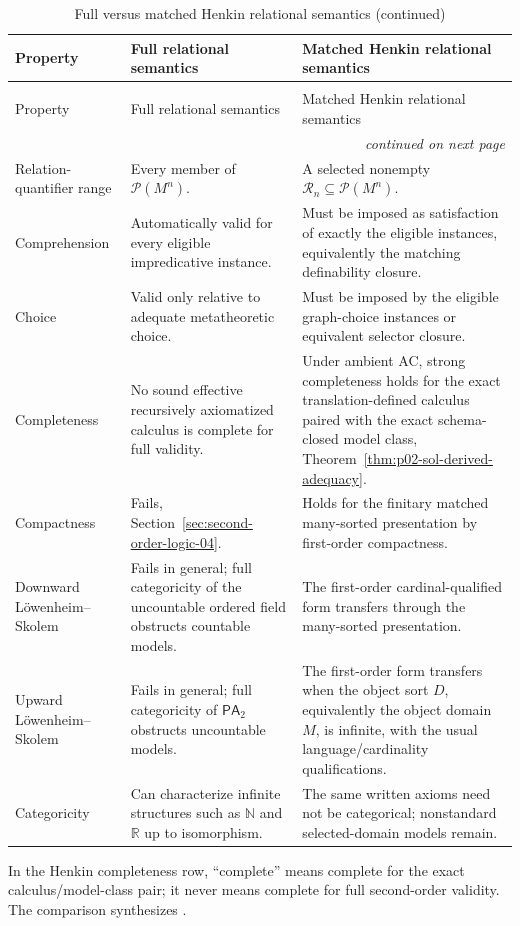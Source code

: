 \begin{landscape}
\begingroup\scriptsize\setlength{\tabcolsep}{4pt}
\begin{longtable}{@{}p{1.35in}p{2.95in}p{2.95in}@{}}
\caption{Full versus matched Henkin relational semantics.}
\label{tab:p02-full-vs-henkin-sol}\\
\toprule
Property & Full relational semantics & Matched Henkin relational semantics \\ \midrule
\endfirsthead
\caption[]{Full versus matched Henkin relational semantics (continued)}\\
\toprule
Property & Full relational semantics & Matched Henkin relational semantics \\ \midrule
\endhead
\midrule\multicolumn{3}{r}{\emph{continued on next page}}\\
\endfoot
\endlastfoot
Relation-quantifier range & Every member of \(\mathcal P(M^n)\). & A selected nonempty \(\mathcal R_n\subseteq\mathcal P(M^n)\). \\
\addlinespace
Comprehension & Automatically valid for every eligible impredicative instance. & Must be imposed as satisfaction of exactly the eligible instances, equivalently the matching definability closure. \\
\addlinespace
Choice & Valid only relative to adequate metatheoretic choice. & Must be imposed by the eligible graph-choice instances or equivalent selector closure. \\
\addlinespace
Completeness & No sound effective recursively axiomatized calculus is complete for full validity. & Under ambient AC, strong completeness holds for the exact translation-defined calculus paired with the exact schema-closed model class, Theorem~\ref{thm:p02-sol-derived-adequacy}. \\
\addlinespace
Compactness & Fails, Section~\ref{sec:second-order-logic-04}. & Holds for the finitary matched many-sorted presentation by first-order compactness. \\
\addlinespace
Downward L\"owenheim--Skolem & Fails in general; full categoricity of the uncountable ordered field obstructs countable models. & The first-order cardinal-qualified form transfers through the many-sorted presentation. \\
\addlinespace
Upward L\"owenheim--Skolem & Fails in general; full categoricity of \(\mathsf{PA}_2\) obstructs uncountable models. & The first-order form transfers when the object sort \(D\), equivalently the object domain \(M\), is infinite, with the usual language/cardinality qualifications. \\
\addlinespace
Categoricity & Can characterize infinite structures such as \(\mathbb N\) and \(\mathbb R\) up to isomorphism. & The same written axioms need not be categorical; nonstandard selected-domain models remain. \\
\bottomrule
\end{longtable}
\endgroup
\end{landscape}

In the Henkin completeness row, ``complete'' means complete for the exact
calculus/model-class pair; it never means complete for full second-order
validity.  The comparison synthesizes
\cite{Henkin1950,Manzano1996,Shapiro1991}.

